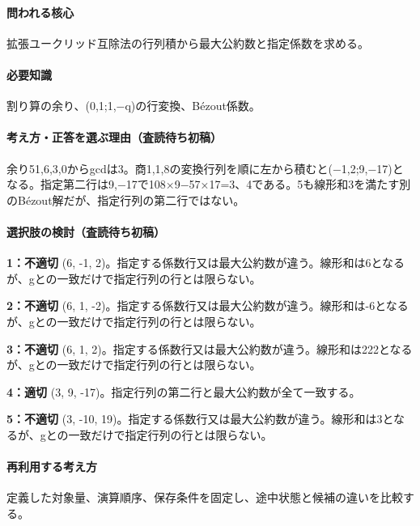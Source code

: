 \paragraph{問われる核心} 拡張ユークリッド互除法の行列積から最大公約数と指定係数を求める。

\paragraph{必要知識} 割り算の余り、(0,1;1,−q)の行変換、Bézout係数。

\paragraph{考え方・正答を選ぶ理由（査読待ち初稿）} 余り51,6,3,0からgcdは3。商1,1,8の変換行列を順に左から積むと(−1,2;9,−17)となる。指定第二行は9,−17で108×9−57×17=\allowbreak{}3、4である。5も線形和3を満たす別のBézout解だが、指定行列の第二行ではない。

\paragraph{選択肢の検討（査読待ち初稿）}\mbox{}\par

\noindent\textbf{1：不適切} (6, -1, 2)。指定する係数行又は最大公約数が違う。線形和は6となるが、gとの一致だけで指定行列の行とは限らない。\par

\noindent\textbf{2：不適切} (6, 1, -2)。指定する係数行又は最大公約数が違う。線形和は-6となるが、gとの一致だけで指定行列の行とは限らない。\par

\noindent\textbf{3：不適切} (6, 1, 2)。指定する係数行又は最大公約数が違う。線形和は222となるが、gとの一致だけで指定行列の行とは限らない。\par

\noindent\textbf{4：適切} (3, 9, -17)。指定行列の第二行と最大公約数が全て一致する。\par

\noindent\textbf{5：不適切} (3, -10, 19)。指定する係数行又は最大公約数が違う。線形和は3となるが、gとの一致だけで指定行列の行とは限らない。\par

\paragraph{再利用する考え方} 定義した対象量、演算順序、保存条件を固定し、途中状態と候補の違いを比較する。

